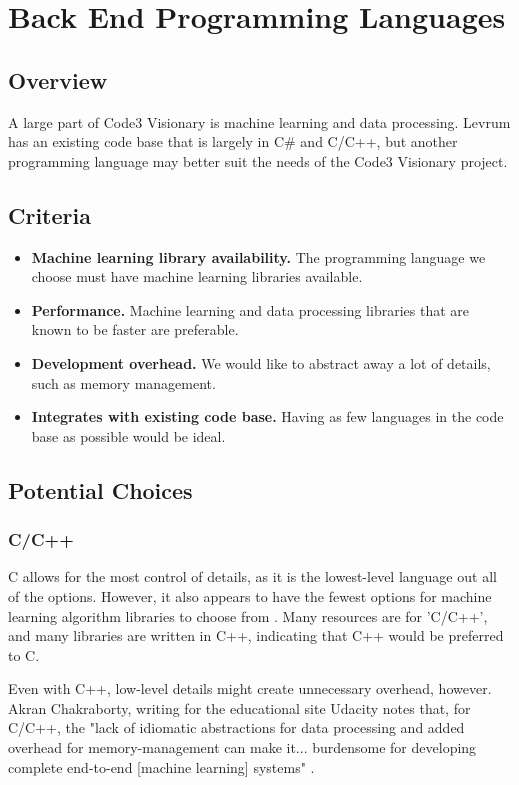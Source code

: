 \documentclass[onecolumn, draftclsnofoot,10pt, compsoc]{IEEEtran}
\begin{document}
\section{Back End Programming Languages}
    \subsection{Overview}
    A large part of Code3 Visionary is machine learning and data processing.
    Levrum has an existing code base that is largely in C\# and C/C++, but another programming language may better suit the needs of the Code3 Visionary project. 
    \subsection{Criteria}
    \begin{itemize}
        \item \textbf{Machine learning library availability.}
        The programming language we choose must have machine learning libraries available.
        \item \textbf{Performance.}
        Machine learning and data processing libraries that are known to be faster are preferable.
        \item \textbf{Development overhead.}
        We would like to abstract away a lot of details, such as memory management.
        \item \textbf{Integrates with existing code base.}
        Having as few languages in the code base as possible would be ideal.
    \end{itemize}

    \subsection{Potential Choices}
    
        \subsubsection{C/C++}
        C allows for the most control of details, as it is the lowest-level language out all of the options.
        However, it also appears to have the fewest options for machine learning algorithm libraries to choose from \cite{MLAlgGit}.
        Many resources are for 'C/C++', and many libraries are written in C++, indicating that C++ would be preferred to C.
        
        Even with C++, low-level details might create unnecessary overhead, however. Akran Chakraborty, writing for the educational site Udacity notes that, for C/C++, the "lack of idiomatic abstractions for data processing and added overhead for memory-management can make it... burdensome for developing complete end-to-end [machine learning] systems" \cite{UdacityChakra}.
        
\end{document}

